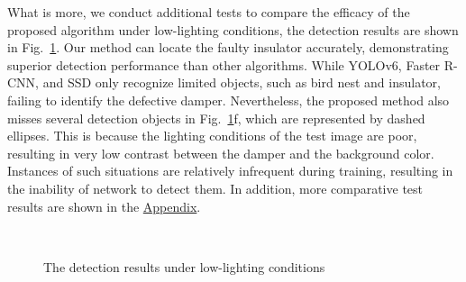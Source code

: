 \documentclass[sn-mathphys,Numbered]{sn-jnl}%
\theoremstyle{thmstyleone}%
\theoremstyle{thmstyletwo}%
\theoremstyle{thmstylethree}%
\begin{document}
What is more, we conduct additional tests to compare the efficacy of the proposed algorithm under low-lighting conditions, the detection results are shown in Fig.~\ref{fig13}. Our method can locate the faulty insulator accurately, demonstrating superior detection performance than other algorithms. While YOLOv6, Faster R-CNN, and SSD only recognize limited objects, such as bird nest and insulator, failing to identify the defective damper. Nevertheless, the proposed method also misses several detection objects in Fig.~\ref{fig13}f, which are represented by dashed ellipses. This is because the lighting conditions of the test image are poor, resulting in very low contrast between the damper and the background color. Instances of such situations are relatively infrequent during training, resulting in the inability of network to detect them. In addition, more comparative test results are shown in the \hyperref[Appendix]{Appendix}.

\begin{figure}[htbp]
	\centering
 \\
 
	\centering
	\caption{The detection results under low-lighting conditions}\label{fig13}
\end{figure}
\end{document}
